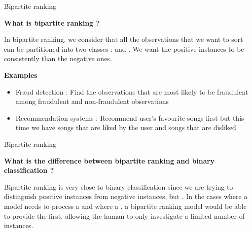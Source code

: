 \begin{frame}{Bipartite ranking}

    {\large\textbf{What is bipartite ranking ?}}
    
    In bipartite ranking, we consider that all the observations that we want to sort can be partitioned into two classes :  and . We want the positive instances to be consistently  than the negative ones.
    
    \vspace{0.3cm}

    {\large\textbf{Examples}}
    
    \begin{itemize}
        \item Fraud detection : Find the observations that are most likely to be fraudulent among fraudulent and non-fraudulent observations
        \item Recommendation systems : Recommend user's favourite songs first but this time we have songs that are liked by the user and songs that are disliked
    \end{itemize}
\end{frame}

\begin{frame}{Bipartite ranking}

    {\large\textbf{What is the difference between bipartite ranking and binary classification ?}}

    Bipartite ranking is very close to binary classification since we are trying to distinguish positive instances from negative instances, but . In the cases where a model needs to process a  and where a , a bipartite ranking model would be able to provide the  first, allowing the human to only investigate a limited number of instances.
    
\end{frame}

